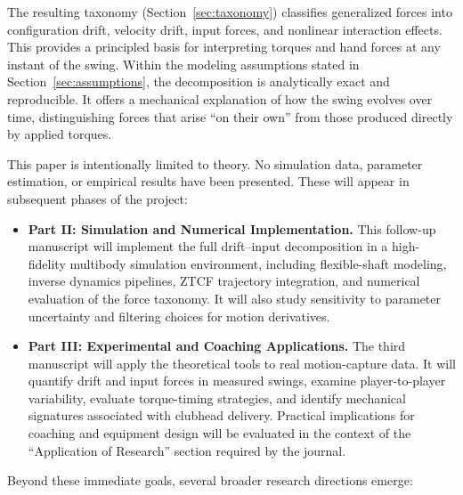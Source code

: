\documentclass[12pt]{article}
\begin{document}
The resulting taxonomy (Section~\ref{sec:taxonomy}) classifies generalized forces into configuration drift, velocity drift, input forces, and nonlinear interaction effects. This provides a principled basis for interpreting torques and hand forces at any instant of the swing. Within the modeling assumptions stated in Section~\ref{sec:assumptions}, the decomposition is analytically exact and reproducible. It offers a mechanical explanation of how the swing evolves over time, distinguishing forces that arise ``on their own'' from those produced directly by applied torques.

This paper is intentionally limited to theory. No simulation data, parameter estimation, or empirical results have been presented. These will appear in subsequent phases of the project:

\begin{itemize}
  \item \textbf{Part II: Simulation and Numerical Implementation.}  
  This follow-up manuscript will implement the full drift--input decomposition in a high-fidelity multibody simulation environment, including flexible-shaft modeling, inverse dynamics pipelines, ZTCF trajectory integration, and numerical evaluation of the force taxonomy. It will also study sensitivity to parameter uncertainty and filtering choices for motion derivatives.

  \item \textbf{Part III: Experimental and Coaching Applications.}  
  The third manuscript will apply the theoretical tools to real motion-capture data. It will quantify drift and input forces in measured swings, examine player-to-player variability, evaluate torque-timing strategies, and identify mechanical signatures associated with clubhead delivery. Practical implications for coaching and equipment design will be evaluated in the context of the ``Application of Research'' section required by the journal.
\end{itemize}

Beyond these immediate goals, several broader research directions emerge:
\end{document}
